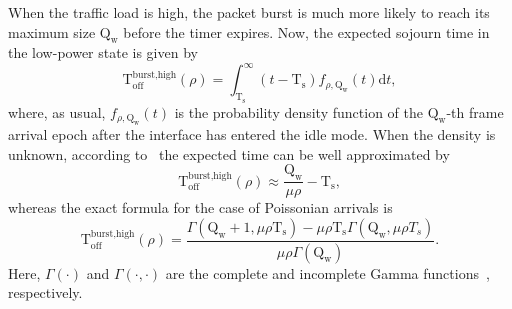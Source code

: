 \documentclass[journal,english,twocolumn,10pt,letterpaper]{IEEEtran}
\newcommand{\added}[1]{{#1}}
\newcommand{\Constantconstant}[2]{\mathrm{#1}_{\mathrm{#2}}}
\newcommand{\Ts}{\Constantconstant T s}
\newcommand{\Qw}{\Constantconstant Q w}
\newcommand{\Toff}{\mathrm{T}_{\mathrm{off}}}
\begin{document}
When the traffic load is high, the packet burst is much more likely to reach
its maximum size $\Qw$ before the timer expires. Now, the expected sojourn
time in the low-power state is given by
\begin{equation}
  \Toff^{\text{burst,high}}(\rho) = \int_{\Ts}^\infty (t -
  \Ts) f_{\rho,\Qw}(t) \textrm{d}t,
\end{equation}
where, as usual, $f_{\rho,\Qw}(t)$ is the probability density function of the
$\Qw$-th frame arrival epoch after the interface has entered the idle mode.
When the density is unknown, \added{according
  to~\cite{herreria12:_gi_g_model_gb_energ_effic_ether}} the expected time can
be well approximated by
\begin{equation}
  \label{eq:burst-h-approx}
  \Toff^{\text{burst,high}}(\rho) \approx \frac{\Qw}{\mu\rho} -
  \Ts,
\end{equation}
whereas the exact formula for the case of Poissonian arrivals is
\begin{equation}
  \label{eq:burst-h-poisson}
  \Toff^{\text{burst,high}}(\rho) = \frac{\Gamma(\Qw + 1, \mu\rho
    \Ts) - \mu\rho \Ts \Gamma(\Qw,\mu\rho
    T_s)}{\mu\rho\Gamma(\Qw)}.
\end{equation}
Here, $\Gamma(\cdot)$ and $\Gamma(\cdot, \cdot)$ are the complete and
incomplete Gamma functions~\cite{Abramowitz72}, respectively.
\end{document}
